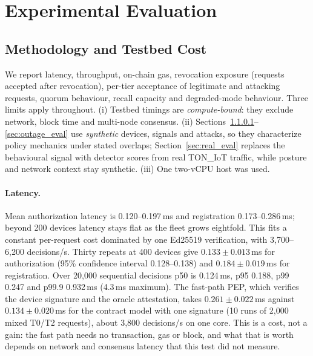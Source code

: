 \section{Experimental Evaluation}\label{sec:eval}

\subsection{Methodology and Testbed Cost}\label{sec:metrics}
We report latency, throughput, on-chain gas, revocation exposure (requests accepted after revocation), per-tier acceptance of legitimate and attacking requests, quorum behaviour, recall capacity and degraded-mode behaviour. Three limits apply throughout. (i) Testbed timings are \emph{compute-bound}: they exclude network, block time and multi-node consensus. (ii) Sections~\ref{sec:scaling}--\ref{sec:outage_eval} use \emph{synthetic} devices, signals and attacks, so they characterize policy mechanics under stated overlaps; Section~\ref{sec:real_eval} replaces the behavioural signal with detector scores from real TON\_IoT traffic, while posture and network context stay synthetic. (iii) One two-vCPU host was used.

\paragraph{Latency.}\label{sec:scaling} Mean authorization latency is 0.120--0.197\,ms and registration 0.173--0.286\,ms; beyond 200 devices latency stays flat as the fleet grows eightfold. This fits a constant per-request cost dominated by one Ed25519 verification, with 3{,}700--6{,}200 decisions/s. Thirty repeats at 400 devices give $0.133\pm0.013$\,ms for authorization (95\% confidence interval 0.128--0.138) and $0.184\pm0.019$\,ms for registration. Over 20{,}000 sequential decisions p50 is 0.124\,ms, p95 0.188, p99 0.247 and p99.9 0.932\,ms (4.3\,ms maximum). The fast-path PEP, which verifies the device signature and the oracle attestation, takes $0.261\pm0.022$\,ms against $0.134\pm0.020$\,ms for the contract model with one signature (10 runs of 2{,}000 mixed T0/T2 requests), about 3{,}800 decisions/s on one core. This is a cost, not a gain: the fast path needs no transaction, gas or block, and what that is worth depends on network and consensus latency that this test did not measure.

